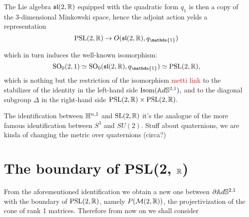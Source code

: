 \begin{observation}
    The Lie algebra $\mathfrak{sl}(2,\mathbb{R})$ equipped with the quadratic form $q_{\mathds{1}}$ is then a copy of the 3-dimensional Minkowski space, hence the adjoint action yelds a representation 
    \[
        \text{PSL}(2,\R)\to O(\mathfrak{sl}(2,\R),q_{\mathds{1}})
    \]

which in turn induces the well-known isomorphism: 
\[
    \text{SO}_0(2,1)\simeq\text{SO}_0(\mathfrak{sl}(2,\R), q_\mathds{1})\simeq \text{PSL}(2,\R),
\] which is nothing but the restriction of the isomorphism \textcolor{red}{metti link} to the stabilizer of the identity in the left-hand side $\text{Isom}(\mathbb{A}d\mathbb{S}^{2,1}),$ and to the diagonal subgroup $\Delta$ in the right-hand side $\text{PSL}(2,\mathbb{R})\times\text{PSL}(2,\mathbb{R}).$
\end{observation}

\begin{observation}
    The identification between $\mathbb{H}^{n,1}$ and $\text{SL}(2,\mathbb{R})$ it's the analogue of the more famous identification between $S^3$ and $SU(2)$. Stuff about quaternions, we are kinda of changing the metric over quaternions (circa?)
\end{observation}

\section{The boundary of PSL(2, $\mathbb{R}$)} 
From the aforementioned identification we obtain a new one between $\partial\mathbb{A}d\mathbb{S}^{2,1}$ with the boundary of $\text{PSL}(2,\mathbb{R})$, namely $P(\mathcal{M}(2,\mathbb{R}))$, the projectivization of the cone of rank 1 matrices. Therefore from now on we shall consider 

